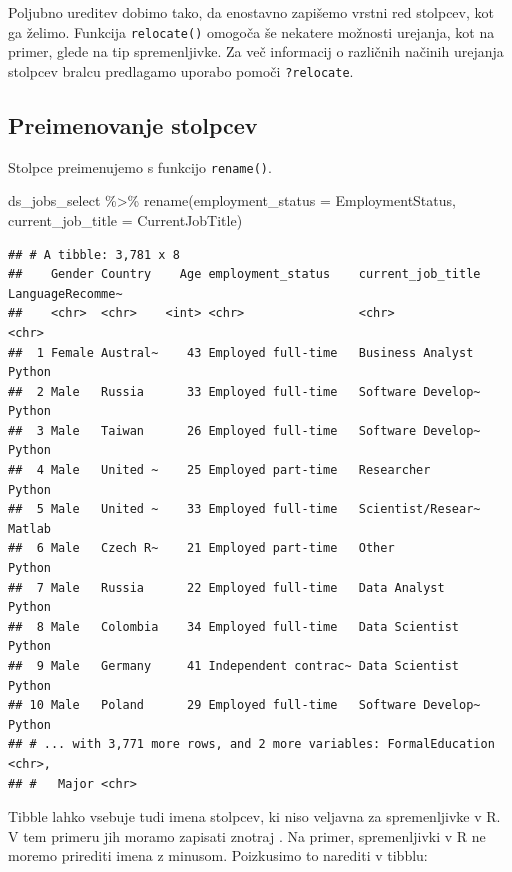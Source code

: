 \documentclass[
]{book}
\newenvironment{Shaded}{\begin{snugshade}}{\end{snugshade}}
\newcommand{\AttributeTok}[1]{\textcolor[rgb]{0.77,0.63,0.00}{#1}}
\newcommand{\FunctionTok}[1]{\textcolor[rgb]{0.00,0.00,0.00}{#1}}
\newcommand{\NormalTok}[1]{#1}
\newcommand{\SpecialCharTok}[1]{\textcolor[rgb]{0.00,0.00,0.00}{#1}}
\begin{document}
Poljubno ureditev dobimo tako, da enostavno zapišemo vrstni red stolpcev, kot ga želimo. Funkcija \texttt{relocate()} omogoča še nekatere možnosti urejanja, kot na primer, glede na tip spremenljivke. Za več informacij o različnih načinih urejanja stolpcev bralcu predlagamo uporabo pomoči \texttt{?relocate}.

\hypertarget{preimenovanje-stolpcev}{%
\subsection{Preimenovanje stolpcev}\label{preimenovanje-stolpcev}}

Stolpce preimenujemo s funkcijo \texttt{rename()}.

\begin{Shaded}
\begin{Highlighting}[]
\NormalTok{ds\_jobs\_select }\SpecialCharTok{\%\textgreater{}\%}
  \FunctionTok{rename}\NormalTok{(}\AttributeTok{employment\_status =}\NormalTok{ EmploymentStatus,}
         \AttributeTok{current\_job\_title =}\NormalTok{ CurrentJobTitle)}
\end{Highlighting}
\end{Shaded}

\begin{verbatim}
## # A tibble: 3,781 x 8
##    Gender Country    Age employment_status    current_job_title LanguageRecomme~
##    <chr>  <chr>    <int> <chr>                <chr>             <chr>           
##  1 Female Austral~    43 Employed full-time   Business Analyst  Python          
##  2 Male   Russia      33 Employed full-time   Software Develop~ Python          
##  3 Male   Taiwan      26 Employed full-time   Software Develop~ Python          
##  4 Male   United ~    25 Employed part-time   Researcher        Python          
##  5 Male   United ~    33 Employed full-time   Scientist/Resear~ Matlab          
##  6 Male   Czech R~    21 Employed part-time   Other             Python          
##  7 Male   Russia      22 Employed full-time   Data Analyst      Python          
##  8 Male   Colombia    34 Employed full-time   Data Scientist    Python          
##  9 Male   Germany     41 Independent contrac~ Data Scientist    Python          
## 10 Male   Poland      29 Employed full-time   Software Develop~ Python          
## # ... with 3,771 more rows, and 2 more variables: FormalEducation <chr>,
## #   Major <chr>
\end{verbatim}

Tibble lahko vsebuje tudi imena stolpcev, ki niso veljavna za spremenljivke v R. V tem primeru jih moramo zapisati znotraj \texttt{\textasciigrave{}}. Na primer, spremenljivki v R ne moremo prirediti imena z minusom. Poizkusimo to narediti v tibblu:
\end{document}

